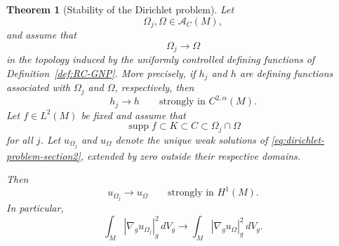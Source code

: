 \documentclass{article}
\newtheorem{theorem}{Theorem}[section]
\begin{document}
\begin{theorem}[Stability of the Dirichlet problem]
\label{thm:stability-dirichlet}
Let
\[
\Omega_j,\Omega\in\mathcal A_C(M),
\]
and assume that
\[
\Omega_j\longrightarrow\Omega
\]
in the topology induced by the uniformly controlled defining
functions of Definition~\ref{def:RC-GNP}. More precisely, if
$h_j$ and $h$ are defining functions associated with $\Omega_j$ and
$\Omega$, respectively, then
\[
h_j\longrightarrow h
\qquad\text{strongly in }C^{2,\alpha}(M).
\]
Let $f\in L^2(M)$ be fixed and assume that
\[
\operatorname{supp}f\subset K\subset C
\subset\Omega_j\cap\Omega
\]
for all $j$. Let $u_{\Omega_j}$ and $u_\Omega$ denote the unique weak
solutions of
\eqref{eq:dirichlet-problem-section2}, extended by zero outside their
respective domains.

Then
\begin{equation}
u_{\Omega_j}\longrightarrow u_\Omega
\qquad\text{strongly in }H^1(M).
\label{eq:strong-H1-stability}
\end{equation}
In particular,
\begin{equation}
\int_M|\nabla_g u_{\Omega_j}|_g^2\,dV_g
\longrightarrow
\int_M|\nabla_g u_\Omega|_g^2\,dV_g.
\label{eq:energy-stability}
\end{equation}
\end{theorem}
\end{document}
